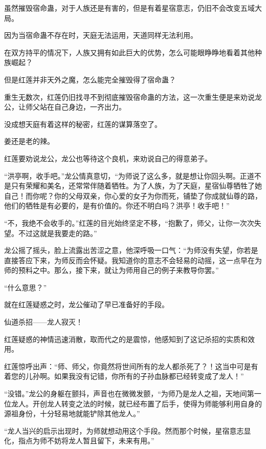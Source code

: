 
\begin{this_body}

虽然摧毁宿命蛊，对于人族还是有害的，但是有着星宿意志，仍旧不会改变五域大局。

因为当宿命蛊不存在时，天庭无法运用，天道同样无法利用。

在双方持平的情况下，人族又拥有如此巨大的优势，怎么可能眼睁睁地看着其他种族崛起？

但是红莲并非天外之魔，怎么能完全摧毁得了宿命蛊？

重生无数次，红莲仍旧找寻不到彻底摧毁宿命蛊的方法，这一次重生便是来劝说龙公，让师父站在自己身边，一齐出力。

没成想天庭有着这样的秘密，红莲的谋算落空了。

姜还是老的辣。

红莲要劝说龙公，龙公也等待这个良机，来劝说自己的得意弟子。

“洪亭啊，收手吧。”龙公情真意切，“为师说了这么多，就是想让你回头啊。正道不是只有荣耀和美名，还常常伴随着牺牲。为了人族，为了天庭，星宿仙尊牺牲了她自己！而你呢？你的父母双亲，你心爱的女子为你而死，铺垫了你成就仙尊的路，他们的牺牲是有必要的，是有价值的。你还不明白吗？洪亭！收手吧！”

“不，我绝不会收手的。”红莲的目光始终坚定不移，“抱歉了，师父，让你一次次失望。不过这就是我要走的路。”

龙公摇了摇头，脸上流露出苦涩之意，他深呼吸一口气：“为师没有失望，你若是直接答应下来，为师反而会怀疑。我知道你的意志不会轻易的动摇，这一点早在为师的预料之中。那么，接下来，就让为师用自己的例子来教导你罢。”

“什么意思？”

就在红莲疑惑之时，龙公催动了早已准备好的手段。

仙道杀招——龙人寂灭！

红莲疑惑的神情迅速消散，取而代之的是震惊，他感知到了这记杀招的实质和效用。

红莲惊呼出声：“师、师父，你竟然将世间所有的龙人都杀死了？！这当中可是有着您的儿孙啊。如果我没有记错，你所有的子孙血脉都已经转变成了龙人！”

“没错。”龙公的身躯在颤抖，声音也在微微发颤，“为师乃是龙人之祖，天地间第一位龙人。开创龙人转变之法的时候，就已经布置了后手，使得为师能够利用自身的源祖身份，十分轻易地就能铲除其他龙人。”

“龙人当兴的启示出现时，为师就想动用这个手段。然而那个时候，星宿意志显化，指点为师不妨将龙人暂且留下，未来有用。”


\end{this_body}
